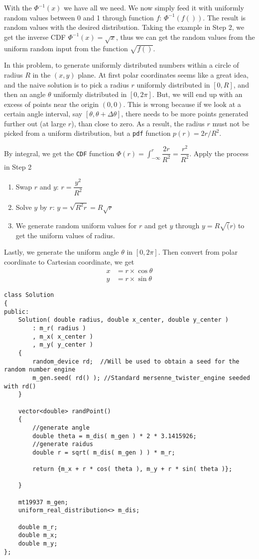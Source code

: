 With the $\Phi^{-1}(x)$ we have all we need. We now simply feed it with uniformly random values between 0 and 1 through function $f$: $\Phi^{-1}(f())$. The result is random values with the desired distribution. Taking the example in Step 2, we get the inverse CDF $\Phi^{-1}(x) = \sqrt{x}$, thus we can get the random values from the uniform random input from the function $\sqrt{f()}$.

In this problem, to generate uniformly distributed numbers within a circle of radius $R$ in the $(x,y)$ plane. At first polar coordinates seems like a great idea, and the naive solution is to pick a radius $r$ uniformly distributed in $[0, R]$, and then an angle $\theta$ uniformly distributed in $[0, 2\pi]$. But, we will end up with an excess of points near the origin $(0, 0)$.  This is wrong because if we look at a certain angle interval, say $[\theta, \theta+\Delta\theta]$, there needs to be more points generated further out (at large $r$), than close to zero. As a result, the radius $r$ must not be picked from a uniform distribution, but a \texttt{pdf} function $p(r) = 2r/R^2$.

By integral, we get the \texttt{CDF} function $\Phi(r) = \int_{-\infty}^{r}\dfrac{2r}{R^2} = \dfrac{r^2}{R^2}$. Apply the process in Step 2
\begin{enumerate}
\item Swap $r$ and $y$: $r=\dfrac{y^2}{R^2}$
\item Solve $y$ by $r$: $y=\sqrt{R^2 r}=R\sqrt{r}$
\item We generate random uniform values for $r$ and get $y$ through $y=R\sqrt(r)$ to get the uniform values of radius.
\end{enumerate}

Lastly, we generate the uniform angle $\theta$ in $[0, 2\pi]$. Then convert from polar coordinate to Cartesian coordinate, we get
\begin{align*}
x &= r\times \cos\theta\\
y &= r\times \sin\theta
\end{align*}


\setcounter{lstlisting}{0}
\begin{lstlisting}[style=customc, caption={Inverse Transform}]
class Solution
{
public:
    Solution( double radius, double x_center, double y_center )
        : m_r( radius )
        , m_x( x_center )
        , m_y( y_center )
    {
        random_device rd;  //Will be used to obtain a seed for the random number engine
        m_gen.seed( rd() ); //Standard mersenne_twister_engine seeded with rd()
    }

    vector<double> randPoint()
    {
        //generate angle
        double theta = m_dis( m_gen ) * 2 * 3.1415926;
        //generate raidus
        double r = sqrt( m_dis( m_gen ) ) * m_r;

        return {m_x + r * cos( theta ), m_y + r * sin( theta )};

    }

    mt19937 m_gen;
    uniform_real_distribution<> m_dis;

    double m_r;
    double m_x;
    double m_y;
};
\end{lstlisting}

